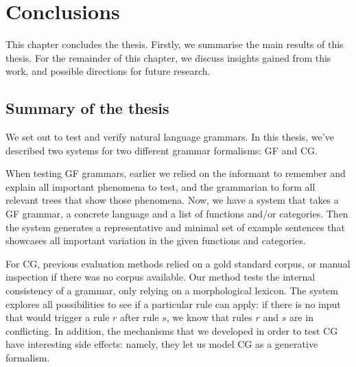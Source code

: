 \chapter{Conclusions}
\label{chapterConclusions}


This chapter concludes the thesis.
Firstly, we summarise the main results of this thesis.
For the remainder of this chapter, we discuss insights gained from this work, and possible directions for future research.

\section{Summary of the thesis}

We set out to test and verify natural language grammars. In this
thesis, we've described two systems for two different grammar
formalisms: GF and CG.

When testing GF grammars, earlier we relied on the informant to
remember and explain all important phenomena to test, and the
grammarian to form all relevant trees that show those phenomena. Now,
we have a system that takes a GF grammar, a concrete language and a
list of functions and/or categories. Then the system generates a
representative and minimal set of example sentences that showcases all
important variation in the given functions and categories.

For CG, previous evaluation methods relied on a gold standard corpus,
or manual inspection if there was no corpus available. Our method
tests the internal consistency of a grammar, only relying on a
morphological lexicon. The system explores all possibilities to see if
a particular rule can apply: if there is no input that would trigger a
rule $r$ after rule $s$, we know that rules $r$ and $s$ are in
conflicting.  In addition, the mechanisms that we developed in order
to test CG have interesting side effects: namely, they let us model CG
as a generative formalism.




